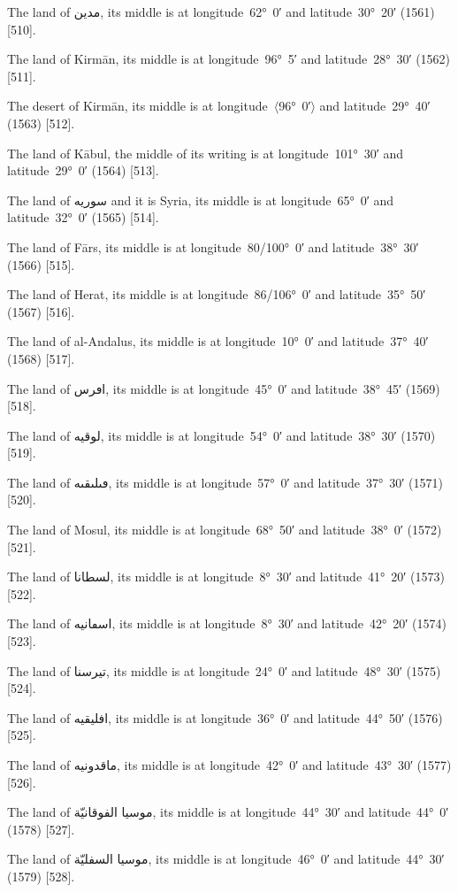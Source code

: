 \documentclass[11pt]{article}
\newcommand{\Pg}[1]{\marginpar{\footnotesize #1}}
\newcommand{\Ang}[1]{\ensuremath{#1}}
\begin{document}
The land of \textarabic{مدين}, its middle is at longitude~62°~0′ and latitude~30°~20′ (1561) [510].

The land of Kirmān, its middle is at longitude~96°~5′ and latitude~28°~30′ (1562) [511].

The desert of Kirmān, its middle is at longitude~\Ang{\langle}96°~0′\Ang{\rangle} and latitude~29°~40′ (1563) [512].

The land of Kābul, the middle of its writing is at longitude~101°~30′ and latitude~29°~0′ (1564) [513].

The land of \textarabic{سوريه} and it is Syria, its middle is at longitude~65°~0′ and latitude~32°~0′ (1565) [514].

The land of Fārs, its middle is at longitude~80/100°~0′ and latitude~38°~30′ (1566) [515]\Pg{p. 103}.

The land of Herat, its middle is at longitude~86/106°~0′ and latitude~35°~50′ (1567) [516].

The land of al-Andalus, its middle is at longitude~10°~0′ and latitude~37°~40′ (1568) [517].

The land of \textarabic{اڡرس}, its middle is at longitude~45°~0′ and latitude~38°~45′ (1569) [518].

The land of \textarabic{لوقيه}, its middle is at longitude~54°~0′ and latitude~38°~30′ (1570) [519].

The land of \textarabic{ڡٮلٮقٮه}, its middle is at longitude~57°~0′ and latitude~37°~30′ (1571) [520].

The land of Mosul, its middle is at longitude~68°~50′ and latitude~38°~0′ (1572) [521].

The land of \textarabic{لسطانا}, its middle is at longitude~8°~30′ and latitude~41°~20′ (1573) [522].

The land of \textarabic{اسڡانيه}, its middle is at longitude~8°~30′ and latitude~42°~20′ (1574) [523].

The land of \textarabic{تيرسنا}, its middle is at longitude~24°~0′ and latitude~48°~30′ (1575) [524].

The land of \textarabic{افليقيه}, its middle is at longitude~36°~0′ and latitude~44°~50′ (1576) [525].

The land of \textarabic{ماقدونيه}, its middle is at longitude~42°~0′ and latitude~43°~30′ (1577) [526].

The land of \textarabic{موسيا الفوقانيّة}, its middle is at longitude~44°~30′ and latitude~44°~0′ (1578) [527].

The land of \textarabic{موسيا السفليّة}, its middle is at longitude~46°~0′ and latitude~44°~30′ (1579) [528].
\end{document}

